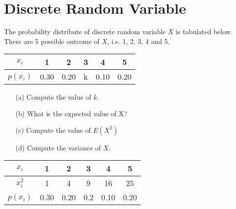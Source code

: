 \documentclass[a4paper,12pt]{article}
\begin{document}
\Large 
\section*{Discrete Random Variable}
The probability distribute of discrete random variable $X$ is tabulated below. There are 5 possible outcome of $X$, i.e. 1, 2, 3, 4 and 5.
\begin{center}
\begin{tabular}{|c||c|c|c|c|c|}
\hline
\phantom{sp} $x_i$  \phantom{sp} & \phantom{sp}1 \phantom{sp} & \phantom{sp}2 \phantom{sp} & \phantom{sp}3 \phantom{sp} & \phantom{sp}4 \phantom{sp} & \phantom{sp}5 \phantom{sp} \\\hline
$p(x_i)$ & 0.30 & 0.20 & k & 0.10 & 0.20 \\
\hline
\end{tabular}
\end{center}
\medskip
\begin{itemize}
\item[(a)] Compute the value of $k$.
\item[(b)] What is the expected value of X?
\item[(c)] Compute the value of $E(X^2)$
\item[(d)] Compute the variance of $X$.
\end{itemize}

\newpage 
\begin{center}
\begin{tabular}{|c||c|c|c|c|c|}
\hline
\phantom{sp}$x_i$ \phantom{sp} & \phantom{sp}1 \phantom{sp} & \phantom{sp}2 \phantom{sp} & \phantom{sp}3 \phantom{sp} & \phantom{sp}4 \phantom{sp} & \phantom{sp}5 \phantom{sp} \\\hline
$x^2_i$  & 1 & 4 & 9 & 16 & 25  \\\hline
$p(x_i)$ & 0.30 & 0.20 & 0.2 & 0.10 & 0.20 \\
\hline
\end{tabular}
\end{center}
\end{document}
